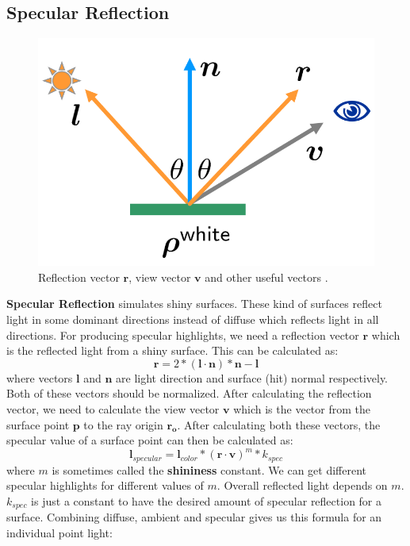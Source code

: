 \documentclass[11pt,a4paper]{article}
\begin{document}
	\subsection{Specular Reflection}
	\begin{figure}
		\centering
		\includegraphics[width=0.65\linewidth]{r_vector_v_vector} 
		\caption{Reflection vector $\boldsymbol{r}$, view vector $\boldsymbol{v}$ and other useful vectors \protect\cite{shadinglecture}.}
		\label{fig:wrapfig}
	\end{figure}
	\textbf{Specular Reflection} simulates shiny surfaces. These kind of surfaces reflect light in some dominant directions instead of diffuse which reflects light in all directions. For producing specular highlights, we need a reflection vector $\boldsymbol{r}$ which is the reflected light from a shiny surface. This can be calculated as:
	\begin{equation}
	\boldsymbol{r} = 2 * (\boldsymbol{l} \cdot \boldsymbol{n}) * \boldsymbol{n} - \boldsymbol{l}
	\end{equation}
	where vectors $\boldsymbol{l}$ and $\boldsymbol{n}$ are light direction and surface (hit) normal respectively. Both of these vectors should be normalized. After calculating the reflection vector, we need to calculate the view vector $\boldsymbol{v}$ which is the vector from the surface point $\boldsymbol{p}$ to the ray origin $\boldsymbol{r_{o}}$. After calculating both these vectors, the specular value of a surface point can then be calculated as:
	\begin{equation}
	\boldsymbol{l}_{specular} = \boldsymbol{l}_{color} * (\boldsymbol{r} \cdot \boldsymbol{v})^m * k_{spec}
	\end{equation}
	where $m$ is sometimes called the \textbf{shininess} constant. We can get different specular highlights for different values of $m$. Overall reflected light depends on $m$. $k_{spec}$ is just a constant to have the desired amount of specular reflection for a surface. Combining diffuse, ambient and specular gives us this formula for an individual point light:
\end{document}
